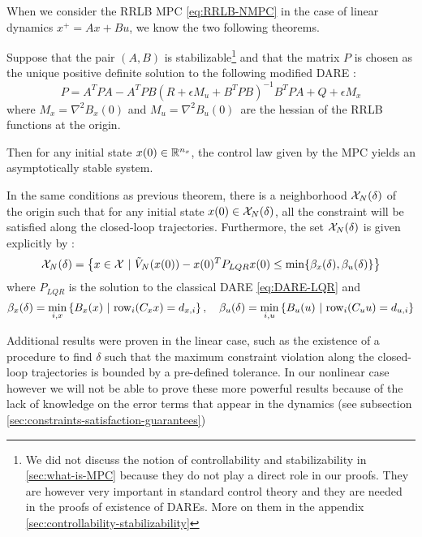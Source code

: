 \documentclass[12pt]{article}
\begin{document}
\vspace{12pt}

When we consider the RRLB MPC \ref{eq:RRLB-NMPC} in the case of linear dynamics $x^+=Ax+Bu$, we know the two following theorems.

\begin{theorem}
	\label{nominal-stability-linear-case}
	Suppose that the pair $(A,B)$ is stabilizable\footnote{We did not discuss the notion of controllability and stabilizability in \ref{sec:what-is-MPC} because they do not play a direct role in our proofs. They are however very important in standard control theory and they are needed in the proofs of existence of DAREs. More on them in the appendix \ref{sec:controllability-stabilizability}}
	and that the matrix $P$ is chosen as the unique positive definite solution to the following modified DARE :
	$$P=A^TPA-A^TPB(R+\epsilon M_u+B^TPB)^{-1}B^TPA+Q+\epsilon M_x$$
	where $M_x=\nabla^2 B_x(0)$ and $M_u=\nabla^2 B_u(0)$\, are the hessian of the RRLB functions at the origin.

	Then for any initial state $x(0)\in\R^{n_x}$, the control law given by the MPC yields an asymptotically stable system.
\end{theorem}

\begin{theorem}
	\label{constraint-satisfaction-guarantee-linear-case}
	In the same conditions as previous theorem, there is a neighborhood $\cal{X}_N(\delta)$ of the origin such that for any initial state $x(0)\in\cal{X}_N(\delta)$, all the constraint will be satisfied along the closed-loop trajectories.
	Furthermore, the set $\cal{X}_N(\delta)$ is given explicitly by :
	$$\cal{X}_N(\delta)=\left\{x\in\cal{X}~|~\tilde{V}_N(x(0))-x(0)^TP_{LQR}x(0)\leq\min\{\beta_x(\delta),\beta_u(\delta)\}\right\}$$
	where $P_{LQR}$ is the solution to the classical DARE \ref{eq:DARE-LQR} and
	$$\beta_x(\delta)=\underset{i,x}{\min}\left\{ B_x(x)~|~\rm{row}_i(C_xx)=d_{x,i} \right\},\quad \beta_u(\delta)=\underset{i,u}{\min}\left\{ B_u(u)~|~\rm{row}_i(C_uu)=d_{u,i} \right\}$$
\end{theorem}

Additional results were proven in the linear case, such as the existence of a procedure to find $\delta$ such that the maximum constraint violation along the closed-loop trajectories is bounded by a pre-defined tolerance.
In our nonlinear case however we will not be able to prove these more powerful results because of the lack of knowledge on the error terms that appear in the dynamics (see subsection \ref{sec:constraints-satisfaction-guarantees})
\end{document}
